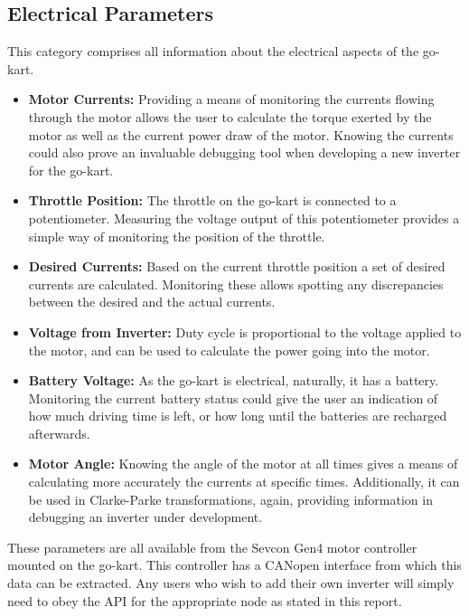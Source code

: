 \subsection{Electrical Parameters}
This category comprises all information about the electrical aspects of the go-kart.
\begin{itemize}
	\item \textbf{Motor Currents:} Providing a means of monitoring the currents flowing through the motor allows the user to calculate the torque exerted by the motor as well as the current power draw of the motor.
	Knowing the currents could also prove an invaluable debugging tool when developing a new inverter for the go-kart.
	\item \textbf{Throttle Position:} The throttle on the go-kart is connected to a potentiometer.
	Measuring the voltage output of this potentiometer provides a simple way of monitoring the position of the throttle.
	\item \textbf{Desired Currents:} Based on the current throttle position a set of desired currents are calculated.
	Monitoring these allows spotting any discrepancies between the desired and the actual currents.
	\item \textbf{Voltage from Inverter:} Duty cycle is proportional to the voltage applied to the motor, and can be used to calculate the power going into the motor.
	\item \textbf{Battery Voltage:} As the go-kart is electrical, naturally, it has a battery.
	Monitoring the current battery status could give the user an indication of how much driving time is left, or how long until the batteries are recharged afterwards.
	\item \textbf{Motor Angle:} Knowing the angle of the motor at all times gives a means of calculating more accurately the currents at specific times.
	Additionally, it can be used in Clarke-Parke transformations, again, providing information in debugging an inverter under development.
\end{itemize}
These parameters are all available from the Sevcon Gen4 motor controller mounted on the go-kart.
This controller has a CANopen interface from which this data can be extracted.
Any users who wish to add their own inverter will simply need to obey the API for the appropriate node as stated in this report.
